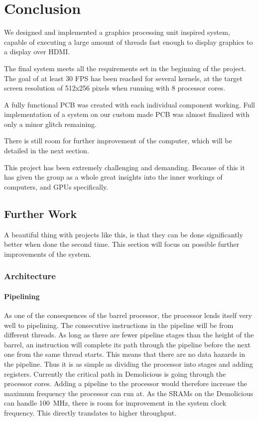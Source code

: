 \documentclass[../main/report.tex]{subfiles}
\begin{document}
\chapter{Conclusion}

We designed and implemented a graphics processing unit inspired system,
capable of executing a large amount of threads fast enough to display graphics to a display over HDMI.

The final system meets all the requirements set in the beginning of the project.
The goal of at least 30 FPS has been reached for several kernels,
at the target screen resolution of 512x256 pixels when running with 8 processor cores.

A fully functional PCB was created with each individual component working.
Full implementation of a system on our custom made PCB was almost finalized with only a minor glitch remaining.

There is still room for further improvement of the computer, which will be detailed in the next section.

This project has been extremely challenging and demanding.
Because of this it has given the group as a whole great insights into the inner workings of computers,
and GPUs specifically.

\section{Further Work}

A beautiful thing with projects like this, is that they can be done significantly better when done the second time.
This section will focus on possible further improvements of the system.

\subsection{Architecture}
\subsubsection*{Pipelining}
As one of the consequences of the barrel processor, the processor lends itself very well to pipelining.
The consecutive instructions in the pipeline will be from different threads.
As long as there are fewer pipeline stages than the height of the barrel, an instruction will complete its path through the pipeline before the next one from the same thread starts.
This means that there are no data hazards in the pipeline. Thus it is as simple as dividing the processor into stages and adding registers.
Currently the critical path in Demolicious is going through the processor cores.
Adding a pipeline to the processor would therefore increase the maximum frequency the processor can run at.
As the SRAMs on the Demolicious can handle \SI{100}{MHz}, there is room for improvement in the system clock frequency.
This directly translates to higher throughput.
\end{document}
